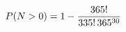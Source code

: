 \documentclass[preview]{standalone}
\begin{document}
\begin{align*}
\special{dvisvgm:raw <g id='unique000'>}P(N>0)=1-\frac{365!}{335!\,365^{30}}\special{dvisvgm:raw </g>}
\end{align*}
\end{document}
